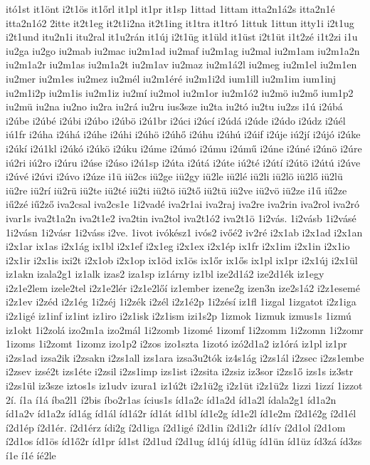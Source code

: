 {itó1st
it1önt
i2t1ös
it1őrl
it1pl
it1pr
it1sp
1ittad
1ittam
itta2n1á2s
itta2n1é
itta2n1ó2
2itte
it2t1eg
it2t1i2na
it2t1ing
it1tra
it1tró
1ittuk
1ittun
itty1i
i2t1ug
i2t1und
itu2n1i
itu2ral
it1u2rán
it1új
i2t1üg
it1üld
it1üst
i2t1üt
i1t2zé
i1t2zi
i1u
iu2ga
iu2go
iu2mab
iu2mac
iu2m1ad
iu2maf
iu2m1ag
iu2mal
iu2m1am
iu2m1a2n
iu2m1a2r
iu2m1as
iu2m1a2t
iu2m1av
iu2maz
iu2m1á2l
iu2meg
iu2m1el
iu2m1en
iu2mer
iu2m1es
iu2mez
iu2mél
iu2m1éré
iu2m1i2d
ium1ill
iu2m1im
ium1inj
iu2m1i2p
iu2m1is
iu2m1iz
iu2mí
iu2mol
iu2m1or
iu2m1ó2
iu2mö
iu2mő
ium1p2
iu2mü
iu2na
iu2no
iu2ra
iu2rá
iu2ru
ius3sze
iu2ta
iu2tó
iu2tu
iu2zs
i1ú
i2úbá
i2úbe
i2úbé
i2úbi
i2úbo
i2úbö
i2ú1br
i2úci
i2úcí
i2údá
i2úde
i2údo
i2údz
i2úél
iú1fr
i2úha
i2úhá
i2úhe
i2úhi
i2úhö
i2úhő
i2úhu
i2úhú
i2úif
i2úje
iú2jí
i2újó
i2úke
i2úkí
i2ú1kl
i2úkó
i2úkö
i2úku
i2úme
i2úmó
i2úmu
i2úmű
i2úne
i2úné
i2únö
i2úre
iú2ri
iú2ro
i2úru
i2úse
i2úso
i2ú1sp
i2úta
i2útá
i2úte
iú2té
i2útí
i2útö
i2útú
i2úve
i2úvé
i2úvi
i2úvo
i2úze
i1ü
iü2cs
iü2ge
iü2gy
iü2le
iü2lé
iü2li
iü2lö
iü2lő
iü2lü
iü2re
iü2rí
iü2rü
iü2te
iü2té
iü2ti
iü2tö
iü2tő
iü2tü
iü2ve
iü2vö
iü2ze
i1ű
iű2ze
iű2zé
iű2ző
iva2csal
iva2cs1e
1i2vadé
iva2r1ai
iva2raj
iva2re
iva2rin
iva2rol
iva2ró
ivar1s
iva2t1a2n
iva2t1e2
iva2tin
iva2tol
iva2t1ó2
iva2t1ö
1i2vás.
1i2vásb
1i2vásé
1i2vásn
1i2vásr
1i2váss
i2ve.
1ivot
ivókész1
ivós2
ivőé2
iv2ré
i2x1ab
i2x1ad
i2x1an
i2x1ar
ix1as
i2x1ág
ix1bl
i2x1ef
i2x1eg
i2x1ex
i2x1ép
ix1fr
i2x1im
i2x1in
i2x1io
i2x1ir
i2x1is
ixi2t
i2x1ob
i2x1op
ix1öd
ix1ös
ix1őr
ix1ős
ix1pl
ix1pr
i2x1új
i2x1ül
iz1akn
izala2g1
iz1alk
izas2
iza1sp
iz1árny
iz1bl
ize2d1á2
ize2d1ék
iz1egy
i2z1e2lem
izele2tel
i2z1e2lér
i2z1e2lőí
iz1ember
izene2g
izen3n
ize2s1á2
i2z1esemé
i2z1ev
i2zéd
i2z1ég
1i2zéj
1i2zék
i2zél
i2z1é2p
1i2zésí
iz1fl
1izgal
1izgatot
i2z1iga
i2z1igé
iz1inf
iz1int
iz1iro
i2z1isk
i2z1ism
izi1s2p
1izmok
1izmuk
izmus1s
1izmú
iz1okt
1i2zolá
izo2m1a
izo2mál
1i2zomb
1izomé
1izomf
1i2zomm
1i2zomn
1i2zomr
1izoms
1i2zomt
1izomz
izo1p2
i2zos
izo1szta
1izotó
izó2d1a2
iz1órá
iz1pl
iz1pr
i2zs1ad
izsa2ik
i2zsakn
i2zs1all
izs1ara
izsa3u2tók
iz4s1ág
i2zs1ál
i2zsec
i2zs1embe
i2zsev
izsé2t
izs1éte
i2zsil
i2zs1imp
izs1ist
i2zsita
i2zsiz
iz3sor
i2zs1ő
izs1s
iz3str
i2zs1ül
iz3sze
iztos1s
iz1udv
izura1
iz1ú2t
i2z1ü2g
i2z1üt
i2z1ü2z
1izzi
1izzí
1izzot
2í.
í1a
í1á
íba2l1
í2bis
íbo2r1as
ícius1s
íd1a2c
íd1a2d
íd1a2l
ídala2g1
íd1a2n
íd1a2v
íd1a2z
íd1ág
íd1ál
íd1á2r
íd1át
íd1bl
íd1e2g
íd1e2l
íd1e2m
í2d1é2g
í2d1él
í2d1ép
í2d1ér.
í2d1érz
ídi2g
í2d1iga
í2d1igé
í2d1in
í2d1i2r
íd1ív
í2d1ol
í2d1om
í2d1os
íd1ös
íd1ő2r
íd1pr
íd1st
í2d1ud
í2d1ug
íd1új
íd1üg
íd1ün
íd1üz
íd3zá
íd3zs
í1e
í1é
íé2le
}
